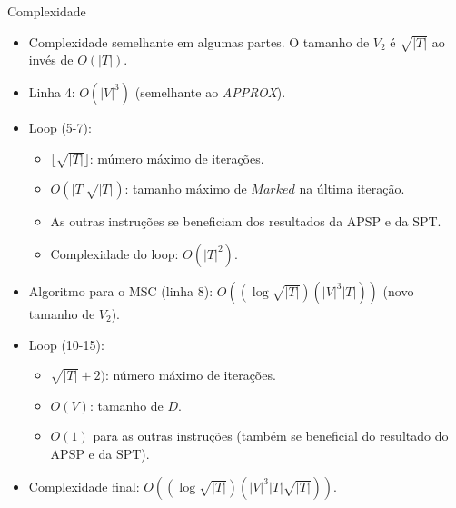 \documentclass[10pt]{beamer}
\begin{document}
\begin{frame}{Complexidade \hyperlink{comp_sim}{}}
\hypertarget{comp_sim_slide}{}
\begin{itemize}
  \item Complexidade semelhante em algumas partes. O tamanho de $V_2$ é $\sqrt{|T|}$ ao invés de $O(|T|)$.
  \item <2-> Linha 4: $O(|V|^3)$ (semelhante ao \emph{APPROX}).
  \item <3-> Loop (5-7): 
  \begin{itemize}
    \item <4-> $\lfloor\sqrt{|T|}\rfloor$: múmero máximo de iterações.
    \item <5-> $O(|T| \sqrt{|T|})$: tamanho máximo de $Marked$ na última iteração.
    \item <6-> As outras instruções se beneficiam dos resultados da APSP e da SPT.
    \item <7-> Complexidade do loop: $O(|T|^2)$.
  \end{itemize}
  \item <8-> Algoritmo para o MSC (linha 8): $O((\log \sqrt{|T|})(|V|^3|T|))$ (novo tamanho de $V_2$).
  \item <9-> Loop (10-15): 
  \begin{itemize}
    \item <10-> $\sqrt{|T|}+2)$: número máximo de iterações.
    \item <11-> $O(V)$: tamanho de $D$.
    \item <12-> $O(1)$ para as outras instruções (também se beneficial do resultado do APSP e da SPT).
  \end{itemize}
  \item <13-> Complexidade final: $O((\log \sqrt{|T|})(|V|^3|T| \sqrt{|T|}))$.
\end{itemize}
\end{frame}



\end{document}
